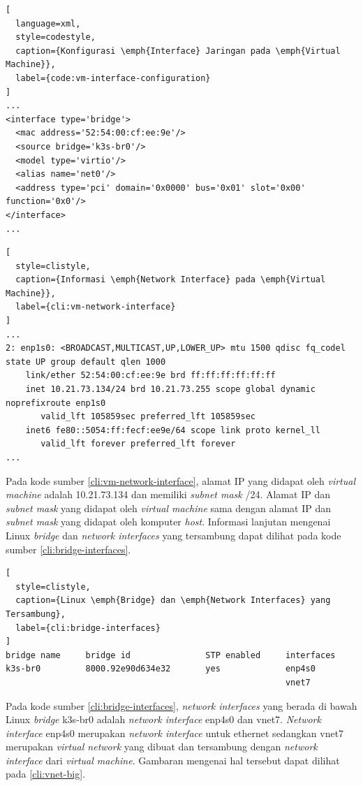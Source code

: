 \begin{lstlisting}[
  language=xml,
  style=codestyle,
  caption={Konfigurasi \emph{Interface} Jaringan pada \emph{Virtual Machine}},
  label={code:vm-interface-configuration}
]
...
<interface type='bridge'>
  <mac address='52:54:00:cf:ee:9e'/>
  <source bridge='k3s-br0'/>
  <model type='virtio'/>
  <alias name='net0'/>
  <address type='pci' domain='0x0000' bus='0x01' slot='0x00' function='0x0'/>
</interface>
...
\end{lstlisting}

{\renewcommand{\lstlistingname}{Instruksi Terminal}
\begin{lstlisting}[
  style=clistyle,
  caption={Informasi \emph{Network Interface} pada \emph{Virtual Machine}},
  label={cli:vm-network-interface}
]
...
2: enp1s0: <BROADCAST,MULTICAST,UP,LOWER_UP> mtu 1500 qdisc fq_codel state UP group default qlen 1000
    link/ether 52:54:00:cf:ee:9e brd ff:ff:ff:ff:ff:ff
    inet 10.21.73.134/24 brd 10.21.73.255 scope global dynamic noprefixroute enp1s0
       valid_lft 105859sec preferred_lft 105859sec
    inet6 fe80::5054:ff:fecf:ee9e/64 scope link proto kernel_ll
       valid_lft forever preferred_lft forever
...
\end{lstlisting}
}

Pada kode sumber \ref{cli:vm-network-interface}, alamat IP yang didapat oleh
\emph{virtual machine} adalah 10.21.73.134 dan memiliki \emph{subnet mask} /24.
Alamat IP dan \emph{subnet mask} yang didapat oleh \emph{virtual machine} sama
dengan alamat IP dan \emph{subnet mask} yang didapat oleh komputer \emph{host}.
Informasi lanjutan mengenai Linux \emph{bridge} dan \emph{network interfaces}
yang tersambung dapat dilihat pada kode sumber \ref{cli:bridge-interfaces}.

{\renewcommand{\lstlistingname}{Instruksi Terminal}
\begin{lstlisting}[
  style=clistyle,
  caption={Linux \emph{Bridge} dan \emph{Network Interfaces} yang Tersambung},
  label={cli:bridge-interfaces}
]
bridge name     bridge id               STP enabled     interfaces
k3s-br0         8000.92e90d634e32       yes             enp4s0
                                                        vnet7
\end{lstlisting}
}

Pada kode sumber \ref{cli:bridge-interfaces}, \emph{network interfaces} yang
berada di bawah Linux \emph{bridge} k3s-br0 adalah \emph{network interface}
enp4s0 dan vnet7. \emph{Network interface} enp4s0 merupakan \emph{network interface}
untuk ethernet sedangkan vnet7 merupakan \emph{virtual network} yang dibuat
dan tersambung dengan \emph{network interface} dari \emph{virtual machine}.
Gambaran mengenai hal tersebut dapat dilihat pada \ref{cli:vnet-big}.

